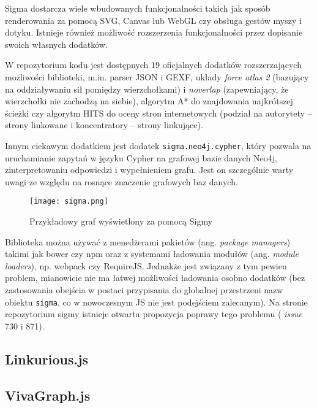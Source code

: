 Sigma dostarcza wiele wbudowanych funkcjonalności takich jak sposób renderowania za pomocą SVG, Canvas lub WebGL czy obsługa gestów myszy i dotyku. Istnieje również możliwość rozszerzenia funkcjonalności przez dopisanie swoich własnych dodatków. 

W repozytorium kodu jest dostępnych 19 oficjalnych dodatków rozszerzających możliwości biblioteki, m.in. parser JSON i GEXF, układy \textit{force atlas 2} (bazujący na oddziaływaniu sił pomiędzy wierzchołkami) i \textit{noverlap} (zapewniający, że wierzchołki nie zachodzą na siebie), algorytm A* do znajdowania najkrótszej ścieżki czy algorytm HITS do oceny stron internetowych (podział na autorytety -- strony linkowane i koncentratory -- strony linkujące). 

Innym ciekawym dodatkiem jest dodatek \texttt{sigma.neo4j.cypher}, który pozwala na uruchamianie zapytań w języku Cypher na grafowej bazie danych Neo4j, zinterpretowaniu odpowiedzi i wypełnieniem grafu. Jest on szczególnie warty uwagi ze względu na rosnące znaczenie grafowych baz danych. 

\bigskip

\begin{figure}[H]
\centering
\texttt{[image: sigma.png]}
\caption{Przykładowy graf wyświetlony za pomocą Sigmy}\label{fig:cytoscape}
\end{figure}

\bigskip

Biblioteka można używać z menedżerami pakietów (ang. \textit{package managers}) takimi jak bower czy npm oraz z systemami ładowania modułów (ang. \textit{module loaders}), np. webpack czy RequireJS. Jednakże jest związany z tym pewien problem, mianowicie nie ma łatwej możliwości ładowania osobno dodatków (bez zastosowania obejścia w postaci przypisania do globalnej przestrzeni nazw obiektu \texttt{sigma}, co w nowoczesnym JS nie jest podejściem zalecanym). Na stronie repozytorium sigmy istnieje otwarta propozycja poprawy tego problemu (\cite{sigma-repo} \textit{issue} 730 i 871).


\subsection{Linkurious.js}


\subsection{VivaGraph.js}



